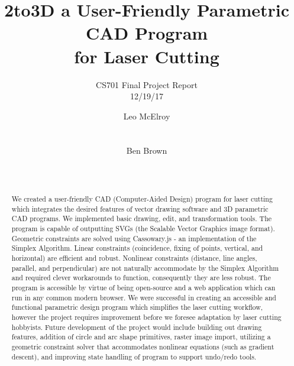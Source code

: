 \documentclass{sig-alternate-05-2015}
\begin{document}
\title{2to3D a User-Friendly Parametric CAD Program\\for Laser Cutting}
\subtitle{CS701 Final Project Report \\ 12/19/17}


\author{
%
\alignauthor
Leo McElroy\\
       \\
       \\
\alignauthor
Ben Brown\\
       \\
       \\
}

\maketitle

\begin{abstract}

We created a user-friendly CAD (Computer-Aided Design) program for laser cutting which integrates the desired features of vector drawing software and 3D parametric CAD programs. We implemented basic drawing, edit, and transformation tools. The program is capable of outputting SVGs (the Scalable Vector Graphics image format). Geometric constraints are solved using Cassowary.js - an implementation of the Simplex Algorithm. Linear constraints (coincidence, fixing of points, vertical, and horizontal) are efficient and robust. Nonlinear constraints (distance, line angles, parallel, and perpendicular) are not naturally accommodate by the Simplex Algorithm and required clever workarounds to function, consequently they are less robust. The program is accessible by virtue of being open-source and a web application which can run in any common modern browser. We were successful in creating an accessible and functional parametric design program which simplifies the laser cutting workflow, however the project requires improvement before we foresee adaptation by laser cutting hobbyists. Future development of the project would include building out drawing features, addition of circle and arc shape primitives, raster image import, utilizing a geometric constraint solver that accommodates nonlinear equations (such as gradient descent), and improving state handling of program to support undo/redo tools. \cite{cassowary}

\end{abstract}
\end{document}
